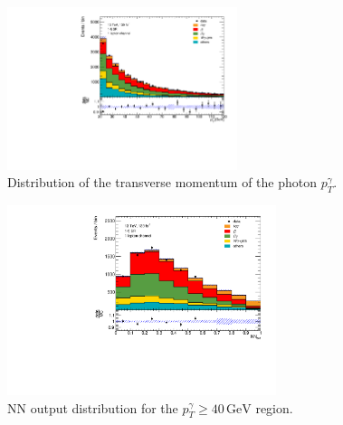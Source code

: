 \begin{figure}
    \centering
    \includegraphics[width=0.6\textwidth]{Plots/ph_pt.pdf}
    \caption{Distribution of the transverse momentum of the photon $p_T^\gamma$.}
    \label{fig:ph_pt}
\end{figure}

\begin{figure}
    \centering
    \includegraphics[width=0.7\textwidth]{Plots/NN_out_mixphA40.pdf}
    \caption{NN output distribution for the $p_T^\gamma \geq 40\,\si{\giga\electronvolt}$ region.}
    \label{fig:outputA40ph}
\end{figure} 

